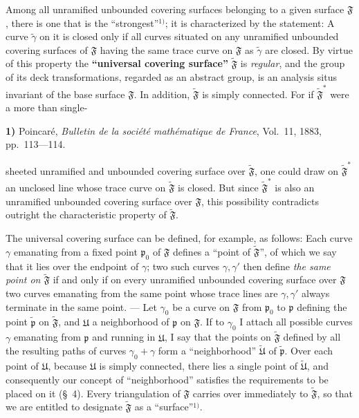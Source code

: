 \documentclass{article}
\begin{document}
Among all unramified unbounded covering surfaces belonging to a given surface $\mathfrak{F}$, there is one that is the ``strongest''${}^{1)}$; it is characterized by the statement: A curve $\tilde{\gamma}$ on it is closed only if all curves situated on any unramified unbounded covering surfaces of $\mathfrak{F}$ having the same trace curve on $\mathfrak{F}$ as $\tilde{\gamma}$ are closed. By virtue of this property the \textbf{``universal covering surface''} $\tilde{\mathfrak{F}}$ is \emph{regular}, and the group of its deck transformations, regarded as an abstract group, is an analysis situs invariant of the base surface $\mathfrak{F}$. In addition, $\tilde{\mathfrak{F}}$ is simply connected. For if $\tilde{\mathfrak{F}}^*$ were a more than single-

\textbf{1)} Poincaré, \emph{Bulletin de la société mathématique de France}, Vol.\ 11, 1883, pp.\ 113---114.

sheeted unramified and unbounded covering surface over $\tilde{\mathfrak{F}}$, one could draw on $\tilde{\mathfrak{F}}^*$ an unclosed line whose trace curve on $\tilde{\mathfrak{F}}$ is closed. But since $\tilde{\mathfrak{F}}^*$ is also an unramified unbounded covering surface over $\mathfrak{F}$, this possibility contradicts outright the characteristic property of $\tilde{\mathfrak{F}}$.

The universal covering surface can be defined, for example, as follows: Each curve $\gamma$ emanating from a fixed point $\mathfrak{p}_0$ of $\mathfrak{F}$ defines a ``point of $\tilde{\mathfrak{F}}$'', of which we say that it lies over the endpoint of $\gamma$; two such curves $\gamma, \gamma'$ then define \emph{the same point on $\tilde{\mathfrak{F}}$} if and only if on every unramified unbounded covering surface over $\mathfrak{F}$ two curves emanating from the same point whose trace lines are $\gamma, \gamma'$ always terminate in the same point. --- Let $\gamma_0$ be a curve on $\mathfrak{F}$ from $\mathfrak{p}_0$ to $\mathfrak{p}$ defining the point $\tilde{\mathfrak{p}}$ on $\tilde{\mathfrak{F}}$, and $\mathfrak{U}$ a neighborhood of $\mathfrak{p}$ on $\mathfrak{F}$. If to $\gamma_0$ I attach all possible curves $\gamma$ emanating from $\mathfrak{p}$ and running in $\mathfrak{U}$, I say that the points on $\tilde{\mathfrak{F}}$ defined by all the resulting paths of curves $\gamma_0 + \gamma$ form a ``neighborhood'' $\tilde{\mathfrak{U}}$ of $\tilde{\mathfrak{p}}$. Over each point of $\mathfrak{U}$, because $\mathfrak{U}$ is simply connected, there lies a single point of $\tilde{\mathfrak{U}}$, and consequently our concept of ``neighborhood'' satisfies the requirements to be placed on it (§~4). Every triangulation of $\mathfrak{F}$ carries over immediately to $\tilde{\mathfrak{F}}$, so that we are entitled to designate $\tilde{\mathfrak{F}}$ as a ``surface''${}^{1)}$.
\end{document}
